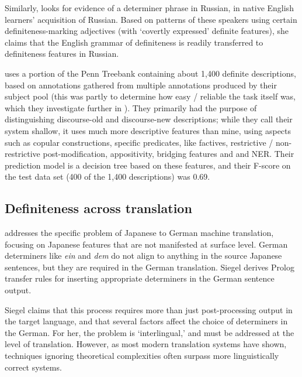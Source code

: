 \documentclass[11pt]{article}\usepackage{graphicx, color}
\begin{document}
Similarly, \citet{cho:2011} looks for evidence of a determiner phrase in Russian, in native English learners' acquisition of Russian. Based on patterns of these speakers using certain definiteness-marking adjectives (with `covertly expressed' definite features), she claims that the English grammar of definiteness is readily transferred to definiteness features in Russian.

\citet{vieira:2000} uses a portion of the Penn Treebank containing about 1,400 definite descriptions, based on annotations gathered from multiple annotations produced by their subject pool (this was partly to determine how easy / reliable the task itself was, which they investigate further in \citet{poesio:1998}). They primarily had the purpose of distinguishing discourse-old and discourse-new descriptions; while they call their system shallow, it uses much more descriptive features than mine, using aspects such as copular constructions, specific predicates, like factives, restrictive / non-restrictive post-modification, appositivity, bridging features and and NER. Their prediction model is a decision tree based on these features, and their F-score on the test data set (400 of the 1,400 descriptions) was 0.69.

\subsection{Definiteness across translation}

\citet{siegel:1996} addresses the specific problem of Japanese to German machine translation, focusing on Japanese features that are not manifested at surface level.
German determiners like \emph{ein} and \emph{dem} do not align to anything in the source Japanese sentences, but they are required in the German translation. Siegel derives Prolog transfer rules for inserting appropriate determiners in the German sentence output.

Siegel claims that this process requires more than just post-processing output in the target language, and that several factors affect the choice of determiners in the German. For her, the problem is `interlingual,' and must be addressed at the level of translation.
However, as most modern translation systems have shown, techniques ignoring theoretical complexities often surpass more linguistically correct systems.
\end{document}
